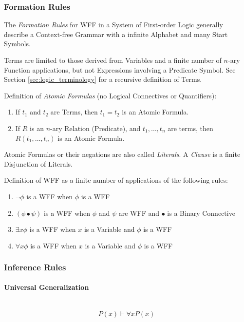 \documentclass{article}
\begin{document}
\subsubsection{Formation Rules}\label{subsec:formation_rules}

The \emph{Formation Rules} for WFF in a System of First-order Logic
generally describe a Context-free Grammar with a infinite Alphabet and
many Start Symbols.

Terms are limited to those derived from Variables and a finite number
of $n$-ary Function applications, but not Expressions involving a
Predicate Symbol. See Section \ref{sec:logic_terminology} for a recursive
definition of Terms.

Definition of \emph{Atomic Formulas} (no Logical Connectives or Quantifiers):
\begin{enumerate}
\item If $t_1$ and $t_2$ are Terms, then $t_1 = t_2$ is an Atomic Formula.
\item If $R$ is an $n$-ary Relation (Predicate), and $t_1,\ldots,t_n$
  are terms, then $R(t_1,\ldots,t_n)$ is an Atomic Formula.
\end{enumerate}
Atomic Formulas or their negations are also called \emph{Literals}. A
\emph{Clause} is a finite Disjunction of Literals.

Definition of WFF as a finite number of applications of the following rules:
\begin{enumerate}
\item $\neg \phi$ is a WFF when $\phi$ is a WFF
\item $(\phi \bullet \psi)$ is a WFF when $\phi$ and $\psi$ are WFF
  and $\bullet$ is a Binary Connective
\item $\exists x \phi$ is a WFF when $x$ is a Variable and $\phi$ is a WFF
\item $\forall x \phi$ is a WFF when $x$ is a Variable and $\phi$ is a WFF
\end{enumerate}




\subsubsection{Inference Rules}

\paragraph{Universal Generalization}\label{subsec:universal_generalization} \hfill
\\
\[P(x) \vdash \forall x P(x)\]
\end{document}
